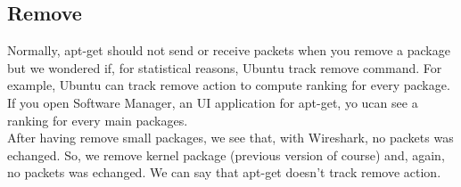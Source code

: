 \documentclass[twoside]{article}
\begin{document}
\begin{multicols}{2}
\subsection{Remove}
Normally, apt-get should not send or receive packets when you remove a package but we wondered if, for statistical reasons, Ubuntu track remove command.  For example, Ubuntu can track remove action to compute ranking for every package.  If you open Software Manager, an UI application for apt-get, yo ucan see a ranking for every main packages.\\
After having remove small packages, we see that, with Wireshark, no packets was echanged.  So, we remove kernel package (previous version of course) and, again, no packets was echanged.  We can say that apt-get doesn't track remove action.\\







\printbibliography


\end{multicols}
\end{document}
